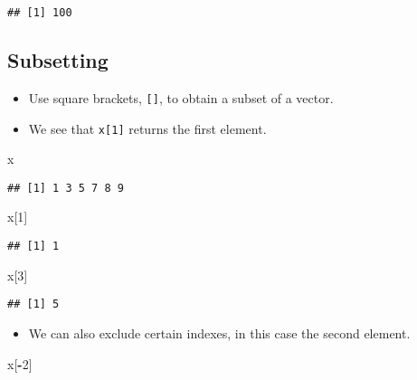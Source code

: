 \documentclass[]{book}
\newenvironment{Shaded}{\begin{snugshade}}{\end{snugshade}}
\newcommand{\DecValTok}[1]{\textcolor[rgb]{0.00,0.00,0.81}{#1}}
\newcommand{\NormalTok}[1]{#1}
\newcommand{\OperatorTok}[1]{\textcolor[rgb]{0.81,0.36,0.00}{\textbf{#1}}}
\providecommand{\tightlist}{%
  \setlength{\itemsep}{0pt}\setlength{\parskip}{0pt}}
\begin{document}
\begin{verbatim}
## [1] 100
\end{verbatim}

\hypertarget{subsetting}{%
\subsection{Subsetting}\label{subsetting}}

\begin{itemize}
\tightlist
\item
  Use square brackets, \texttt{{[}{]}}, to obtain a subset of a vector.
\item
  We see that \texttt{x{[}1{]}} returns the first element.
\end{itemize}

\begin{Shaded}
\begin{Highlighting}[]
\NormalTok{x}
\end{Highlighting}
\end{Shaded}

\begin{verbatim}
## [1] 1 3 5 7 8 9
\end{verbatim}

\begin{Shaded}
\begin{Highlighting}[]
\NormalTok{x[}\DecValTok{1}\NormalTok{]}
\end{Highlighting}
\end{Shaded}

\begin{verbatim}
## [1] 1
\end{verbatim}

\begin{Shaded}
\begin{Highlighting}[]
\NormalTok{x[}\DecValTok{3}\NormalTok{]}
\end{Highlighting}
\end{Shaded}

\begin{verbatim}
## [1] 5
\end{verbatim}

\begin{itemize}
\tightlist
\item
  We can also exclude certain indexes, in this case the second element.
\end{itemize}

\begin{Shaded}
\begin{Highlighting}[]
\NormalTok{x[}\OperatorTok{-}\DecValTok{2}\NormalTok{]}
\end{Highlighting}
\end{Shaded}
\end{document}
